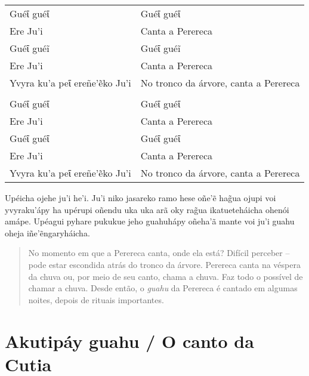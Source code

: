 \begin{table}[]
\begin{tabular}{ll}
Guéῖ guéῖ                     & Guéῖ guéῖ                             \\
Ere Ju'i                      & Canta a Perereca                      \\
Guéῖ guéĩ                     & Guéῖ guéĩ                             \\
Ere Ju'i                      & Canta a Perereca                      \\
Yvyra ku'a peῖ ereñe'ẽko Ju'i & No tronco da árvore, canta a Perereca \\
                              &                                       \\
Guéῖ guéῖ                     & Guéῖ guéῖ                             \\
Ere Ju'i                      & Canta a Perereca                      \\
Guéῖ guéῖ                     & Guéῖ guéῖ                             \\
Ere Ju'i                      & Canta a Perereca                      \\
Yvyra ku'a peῖ ereñe'ẽko Ju'i & No tronco da árvore, canta a Perereca
\end{tabular}
\end{table}

Upéicha ojehe ju'i he'i. Ju'i niko jasareko ramo hese oñe'ẽ hag̃ua ojupi
voi yvyraku'ápy ha upérupi oñendu uka uka arã oky rag̃ua ikatueteháicha
ohenói amápe. Upéagui pyhare pukukue jeho guahuhápy oñeha'ã mante voi
ju'i guahu oheja iñe'ẽngaryháicha.

\begin{quote}
No momento em que a Perereca canta, onde ela está? Difícil perceber --
pode estar escondida atrás do tronco da árvore. Perereca canta na
véspera da chuva ou, por meio de seu canto, chama a chuva. Faz todo o
possível de chamar a chuva. Desde então, o \emph{guahu} da Perereca é
cantado em algumas noites, depois de rituais importantes.
\end{quote}

\chapter{Akutipáy guahu / O canto da Cutia}

